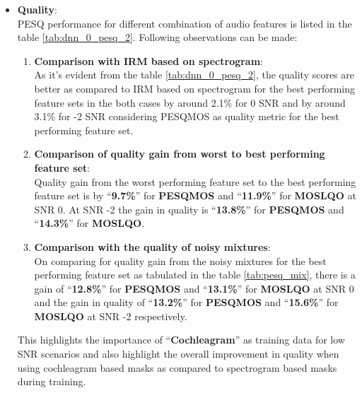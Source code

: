 \begin{enumerate}
\begin{itemize}
\item \textbf{Quality}:\\
PESQ performance for different combination of audio features is listed in the table \ref{tab:dnn_0_pesq_2}. Following observations can be made:\\ 
\begin{enumerate}
\item \textbf{Comparison with IRM based on spectrogram}:\\
As it's evident from the table \ref{tab:dnn_0_pesq_2}, the quality scores are better as compared to IRM based on spectrogram for the best performing feature sets in the both cases by around 2.1\% for 0 SNR and by around 3.1\% for -2 SNR considering PESQMOS as quality metric for the best performing feature set. 
\item \textbf{Comparison of quality gain from worst to best performing feature set}:\\
Quality gain from the worst performing feature set to the best performing feature set is by \enquote{\textbf{9.7\%}} for \textbf{PESQMOS} and \enquote{\textbf{11.9\%}} for \textbf{MOSLQO} at SNR 0. At SNR -2 the gain in quality is \enquote{\textbf{13.8\%}} for \textbf{PESQMOS} and  \enquote{\textbf{14.3\%}} for \textbf{MOSLQO}.
\item \textbf{Comparison with the quality of noisy mixtures}:\\
On comparing for quality gain from the noisy mixtures for the best performing feature set as tabulated in the table \ref{tab:pesq_mix}, there is a gain of \enquote{\textbf{12.8\%}} for \textbf{PESQMOS} and \enquote{\textbf{13.1\%}} for \textbf{MOSLQO} at SNR 0 and the gain in quality of \enquote{\textbf{13.2\%}} for \textbf{PESQMOS} and \enquote{\textbf{15.6\%}} for \textbf{MOSLQO} at SNR -2 respectively.
\end{enumerate}
This highlights the importance of \enquote{\textbf{Cochleagram}} as  training data for low SNR scenarios and also highlight the overall improvement in quality when using cochleagram based masks as compared to spectrogram based masks during training.
\end{itemize}
\end{enumerate}

